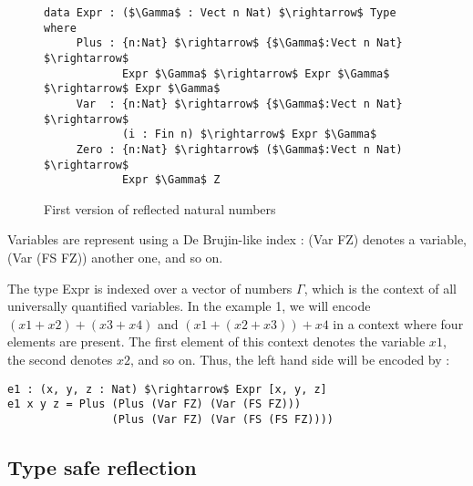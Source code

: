 \begin{figure}[H]
\figrule
\begin{center}
\begin{lstlisting}
data Expr : ($\Gamma$ : Vect n Nat) $\rightarrow$ Type where
     Plus : {n:Nat} $\rightarrow$ {$\Gamma$:Vect n Nat} $\rightarrow$ 
            Expr $\Gamma$ $\rightarrow$ Expr $\Gamma$ $\rightarrow$ Expr $\Gamma$
     Var  : {n:Nat} $\rightarrow$ {$\Gamma$:Vect n Nat} $\rightarrow$ 
            (i : Fin n) $\rightarrow$ Expr $\Gamma$
     Zero : {n:Nat} $\rightarrow$ ($\Gamma$:Vect n Nat) $\rightarrow$ 
            Expr $\Gamma$ Z
\end{lstlisting}
\end{center}
\caption{First version of reflected natural numbers}
\label{reflectedNaturalNumbers0}
\figrule
\end{figure}


Variables are represent using a De Brujin-like index : (Var FZ) denotes a variable, (Var (FS FZ)) another one, and so on.

The type Expr is indexed over a vector of numbers $\Gamma$, which is the context of all universally quantified variables. In the example 1, we will encode $(x1 + x2) + (x3 + x4)$ and $(x1 + (x2 + x3)) + x4$ in a context where four elements are present. The first element of this context denotes the variable $x1$, the second denotes $x2$, and so on.
Thus, the left hand side will be encoded by :

\begin{lstlisting}
e1 : (x, y, z : Nat) $\rightarrow$ Expr [x, y, z]
e1 x y z = Plus (Plus (Var FZ) (Var (FS FZ))) 
                (Plus (Var FZ) (Var (FS (FS FZ))))
\end{lstlisting}


\subsection{Type safe reflection}

